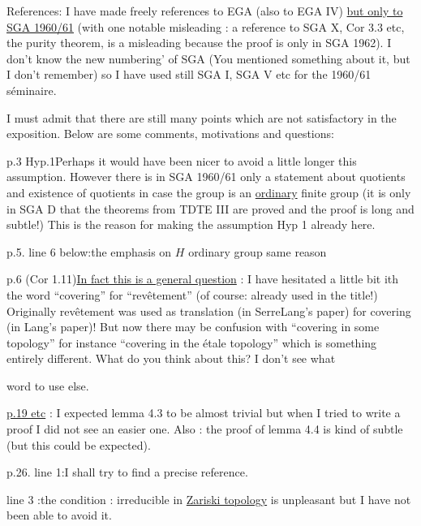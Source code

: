 References: I have made freely references to EGA (also to EGA IV) \uline{but only to SGA 1960/61} (with one notable misleading : a reference to SGA X, Cor 3.3 etc, the purity theorem, is a misleading because the proof is only in SGA 1962). I don't know the new numbering' of SGA (You mentioned something about it, but I don't remember) so I have used still SGA I, SGA V etc for the 1960/61 séminaire.

I must admit that there are still many points which are not satisfactory in the exposition. Below are some comments, motivations and questions:

p.3 Hyp.1\quad Perhaps it would have been nicer to avoid a little longer this assumption. However there is in SGA 1960/61 only a statement about quotients and existence of quotients in case the group is an \uline{ordinary} finite group (it is only in SGA D that the theorems from TDTE III are proved and the proof is long and subtle!) This is the reason for making the assumption Hyp 1 already here.

p.5. line 6 below:\quad the emphasis on $H$ ordinary group  same reason

p.6 (Cor 1.11)\quad \uline{In fact this is a general question} : I have hesitated a little bit ith the word ``covering'' for ``revêtement'' (of course: already used in the title!)
Originally revêtement was used as translation  (in SerreLang's paper) for covering (in Lang's paper)! But now there may be confusion with ``covering in some topology'' for instance ``covering in the étale topology'' which is something entirely different. What do you think about this? I don't see what

word to use else.

\reversemarginpar
\margin{!}\uline{p.19 etc} : I expected lemma 4.3 to be almost trivial but when I tried to write a proof I did not see an easier one. Also : the proof of lemma 4.4 is kind of subtle (but this could be expected).

p.26. line 1:\quad I shall try to find a precise reference.

line 3 :\quad the condition : irreducible in \uline{Zariski topology} is unpleasant but I have not been able to avoid it.

